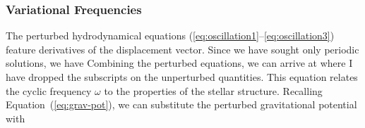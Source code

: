 
\subsubsection*{Variational Frequencies}
The perturbed hydrodynamical equations  (\ref{eq:oscillation1}--\ref{eq:oscillation3}) feature derivatives of the displacement vector. 
Since we have sought only periodic solutions, we have
Combining the perturbed equations, we can arrive at \citep[e.g.,][]{1979nos..book.....U}
where I have dropped the subscripts on the unperturbed quantities. 
This equation relates the cyclic frequency $\omega$ to the properties of the stellar structure. 
Recalling Equation~(\ref{eq:grav-pot}), we can substitute the perturbed gravitational potential with 
\lr{\begin{equation}
    \vec g'
    =
    -\nabla \Phi'
    =
    G \nabla
    \int_V
        \frac{\rho'}{|\vec r - \vec x|}%
    \;\text{d}^3 \vec{x}
    =
    -G \nabla \int_V
        \frac{\nabla%
            \cdot \left(
                \rho%
                \vec\xi%
            \right)}{|\vec r - \vec x|}%
    \;\text{d}^3 \vec{x}.
\end{equation}}
